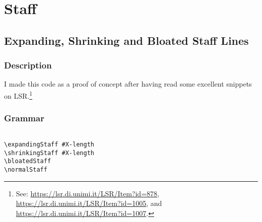 
\chapter {Staff}


\section {Expanding, Shrinking and Bloated Staff Lines}
\hfill

\subsection{Description}
I made this code as a proof of concept after having read some excellent snippets on LSR.\footnote{See: \url{https://lsr.di.unimi.it/LSR/Item?id=878}, \url{https://lsr.di.unimi.it/LSR/Item?id=1005}, and \url{https://lsr.di.unimi.it/LSR/Item?id=1007}. }

\subsection{Grammar}
\begin{verbatim}

\expandingStaff #X-length
\shrinkingStaff #X-length
\bloatedStaff
\normalStaff

\end{verbatim}
